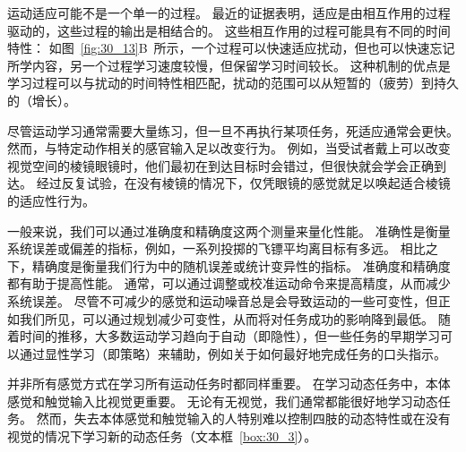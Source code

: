 运动适应可能不是一个单一的过程。
最近的证据表明，适应是由相互作用的过程驱动的，这些过程的输出是相结合的。
这些相互作用的过程可能具有不同的时间特性：
如图~\ref{fig:30_13}B~所示，一个过程可以快速适应扰动，但也可以快速忘记所学内容，另一个过程学习速度较慢，但保留学习时间较长。
这种机制的优点是学习过程可以与扰动的时间特性相匹配，扰动的范围可以从短暂的（疲劳）到持久的（增长）。


尽管运动学习通常需要大量练习，但一旦不再执行某项任务，死适应通常会更快。
然而，与特定动作相关的感官输入足以改变行为。
例如，当受试者戴上可以改变视觉空间的棱镜眼镜时，他们最初在到达目标时会错过，但很快就会学会正确到达。
经过反复试验，在没有棱镜的情况下，仅凭眼镜的感觉就足以唤起适合棱镜的适应性行为。


一般来说，我们可以通过准确度和精确度这两个测量来量化性能。
准确性是衡量系统误差或偏差的指标，例如，一系列投掷的飞镖平均离目标有多远。
相比之下，精确度是衡量我们行为中的随机误差或统计变异性的指标。
准确度和精确度都有助于提高性能。
通常，可以通过调整或校准运动命令来提高精度，从而减少系统误差。
尽管不可减少的感觉和运动噪音总是会导致运动的一些可变性，但正如我们所见，可以通过规划减少可变性，从而将对任务成功的影响降到最低。
随着时间的推移，大多数运动学习趋向于自动（即隐性），但一些任务的早期学习可以通过显性学习（即策略）来辅助，例如关于如何最好地完成任务的口头指示。


并非所有感觉方式在学习所有运动任务时都同样重要。
在学习动态任务中，本体感觉和触觉输入比视觉更重要。 无论有无视觉，我们通常都能很好地学习动态任务。
然而，失去本体感觉和触觉输入的人特别难以控制四肢的动态特性或在没有视觉的情况下学习新的动态任务（文本框~\ref{box:30_3}）。


